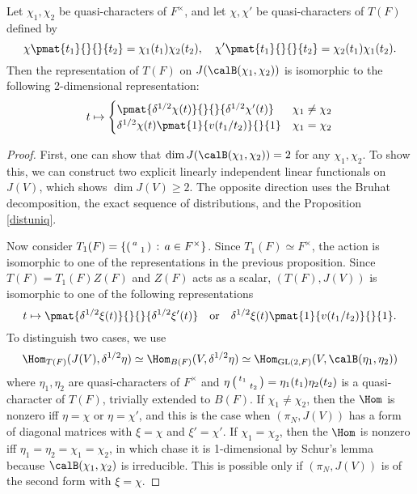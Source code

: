\begin{theorem}
\label{psjac}
Let $\chi_1, \chi_2$ be quasi-characters of $F^{\times}$, and let $\chi, \chi'$ be quasi-characters of $T(F)$ defined by 
$$
\chi\pmat{t_1}{}{}{t_2} = \chi_1(t_1)\chi_2(t_2), \quad \chi'\pmat{t_1}{}{}{t_2} = \chi_2(t_1)\chi_1(t_2). 
$$
Then the representation of $T(F)$ on $J(\calB(\chi_1, \chi_2))$ is isomorphic to the following 2-dimensional representation:
\begin{align*}
t\mapsto \begin{cases} \pmat{\delta^{1/2}\chi(t)}{}{}{\delta^{1/2}\chi'(t)} & \chi_1 \neq \chi_2 \\ 
\delta^{1/2}\chi(t) \pmat{1}{v(t_1/t_2)}{}{1} & \chi_1 = \chi_2 \end{cases}
\end{align*}
\end{theorem}
\begin{proof}
First, one can show that $\dim J(\calB(\chi_1, \chi_2)) = 2$ for any $\chi_1, \chi_2$. 
To show this, we can construct two explicit linearly independent linear functionals on $J(V)$, which shows $\dim J(V) \geq 2$. The opposite direction uses the Bruhat decomposition, the exact sequence of distributions, and the Proposition \ref{distuniq}. 

Now consider $T_{1}(F) = \left\{ \left(\begin{smallmatrix} a &  \\  & 1 \end{smallmatrix}\right)\,:\, a\in F^{\times}\right\}$. Since $T_1(F)\simeq F^{\times}$, the action is isomorphic to one of the representations in the previous proposition. 
Since $T(F) = T_{1}(F)Z(F)$ and $Z(F)$ acts as a scalar, $(T(F), J(V))$ is isomorphic to one of the following representations
$$
t\mapsto \pmat{\delta^{1/2}\xi(t)}{}{}{\delta^{1/2}\xi'(t)}\quad\text{or}\quad \delta^{1/2}\xi(t)\pmat{1}{v(t_1/t_2)}{}{1}. 
$$
To distinguish two cases, we use
\begin{align*}
\Hom_{T(F)}(J(V), \delta^{1/2}\eta) \simeq \Hom_{B(F)}(V, \delta^{1/2}\eta) \simeq \Hom_{\GL(2, F)}(V, \calB(\eta_1, \eta_2))
\end{align*}
where $\eta_1, \eta_2$ are quasi-characters of $F^{\times}$ and $\eta\left(\begin{smallmatrix} t_1 &  \\  & t_2 \end{smallmatrix}\right) = \eta_1(t_1)\eta_2(t_2)$ is a quasi-character of $T(F)$, trivially extended to $B(F)$. 
If $\chi_1 \neq \chi_2$, then the $\Hom$ is nonzero iff  $\eta = \chi$ or $\eta = \chi'$, and this is the case when $(\pi_N, J(V))$ has a form of diagonal matrices with $\xi = \chi$ and $\xi' = \chi'$. 
If $\chi_1 = \chi_2$, then the $\Hom$ is nonzero iff $\eta_1 =\eta_2 = \chi_1 = \chi_2$, in which chase it is 1-dimensional by Schur's lemma because $\calB(\chi_1, \chi_2)$ is irreducible. This is possible only if $(\pi_N, J(V))$ is of the second form with $\xi = \chi$. 
\end{proof}





